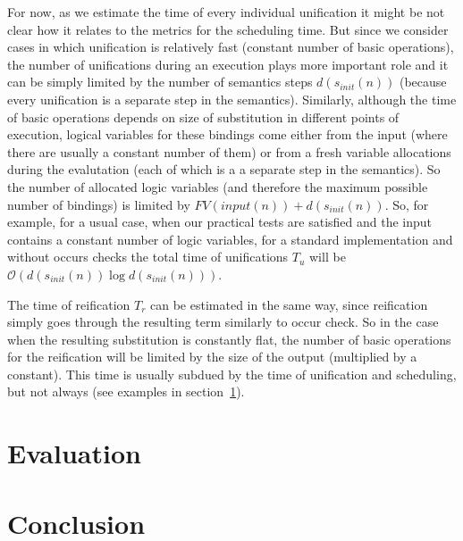 \documentclass[acmsmall, anonymous, review]{acmart}
\newcommand{\sectionword}{section}
\renewcommand{\O}{\mathcal{O}}
\begin{document}
For now, as we estimate the time of every individual unification it might be not clear how it relates to the metrics for the scheduling time. But since we consider cases in which unification is relatively fast (constant number of basic operations), the number of unifications during an execution plays more important role and it can be simply limited by the number of semantics steps $d(s_{init}(n))$ (because every unification is a separate step in the semantics). Similarly, although the time of basic operations depends on size of substitution in different points of execution, logical variables for these bindings come either from the input (where there are usually a constant number of them) or from a fresh variable allocations during the evalutation (each of which is a a separate step in the semantics). So the number of allocated logic variables (and therefore the maximum possible number of bindings) is limited by $FV(input(n)) + d(s_{init}(n))$. So, for example, for a usual case, when our practical tests are satisfied and the input contains a constant number of logic variables, for a standard implementation and without occurs checks the total time of unifications $T_u$ will be $\O(d(s_{init}(n)) \log d(s_{init}(n)))$.

The time of reification $T_r$ can be estimated in the same way, since reification simply goes through the resulting term similarly to occur check. So in the case when the resulting substitution is constantly flat, the number of basic operations for the reification will be limited by the size of the output (multiplied by a constant). This time is usually subdued by the time of unification and scheduling, but not always (see examples in \sectionword~\ref{sec:evaluation}).



\section{Evaluation}
\label{sec:evaluation}


\section{Conclusion}


\begin{acks}

\end{acks}




\appendix
\end{document}
